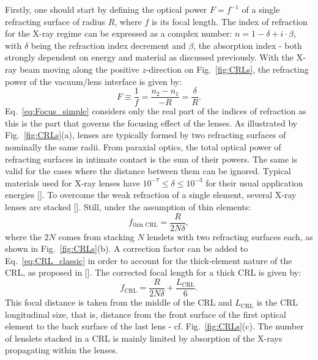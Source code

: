 \begin{refsection}
Firstly, one should start by defining the optical power $F=f^{-1}$ of a single refracting surface of radius $R$, where $f$ is its focal length. The index of refraction for the X-ray regime can be expressed as a complex number: $n = 1-\delta+i\cdot\beta$, with $\delta$ being the refraction index decrement and $\beta$, the absorption index - both strongly dependent on energy and material as discussed previously. With the X-ray beam moving along the positive $z$-direction on Fig.~\ref{fig:CRLs}, the refracting power of the vacuum/lens interface is given by:
\begin{equation}\label{eq:Focus_simple}
    F\equiv\frac{1}{f}=\frac{n_2-n_1}{-R}=\frac{\delta}{R}.
\end{equation}{}
Eq.~\ref{eq:Focus_simple} considers only the real part of the indices of refraction as this is the part that governs the focusing effect of the lenses. As illustrated by Fig.~\ref{fig:CRLs}(a), lenses are typically formed by two refracting surfaces of nominally the same radii. From paraxial optics, the total optical power of refracting surfaces in intimate contact is the sum of their powers. The same is valid for the cases where the distance between them can be ignored. Typical materials used for X-ray lenses have $10^{-7}\leq\delta\leq10^{-3}$ for their usual application energies [\cite{Serebrennikov2016}]. To overcome the weak refraction of a single element, several X-ray lenses are stacked [\cite{Tomie1994, Snigirev1996}]. Still, under the assumption of thin elements:
\begin{equation}\label{eq:CRL_classic}
    f_{\text{thin}\text{~CRL}} = \frac{R}{2N\delta},
\end{equation}{}
where the $2N$ comes from stacking $N$ lenslets with two refracting surfaces each, as shown in Fig.~\ref{fig:CRLs}(b). A correction factor can be added to Eq.~\ref{eq:CRL_classic} in order to account for the thick-element nature of the CRL, as proposed in [\cite{Kohn2003}]. The corrected focal length for a thick CRL is given by:
\begin{equation}\label{eq:CRL}
        f_{\text{CRL}} = \frac{R}{2N\delta}+\frac{L_{\text{CRL}}}{6}.
\end{equation}{}
This focal distance is taken from the middle of the CRL and $L_{\text{CRL}}$ is the CRL longitudinal size, that is, distance from the front surface of the first optical element to the back surface of the last lens - cf. Fig.~\ref{fig:CRLs}(c). The number of lenslets stacked in a CRL is mainly limited by absorption of the X-rays propagating within the lenses. 

\end{refsection}
